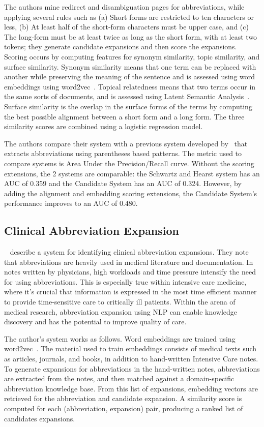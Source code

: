 \documentclass[11pt,a4paper]{article}
\begin{document}
The authors mine redirect and disambiguation pages for abbreviations,
while applying several rules such as (a) Short forms are restricted to
ten characters or less, (b) At least half of the short-form characters
must be upper case, and (c) The long-form must be at least twice as
long as the short form, with at least two tokens; they generate
candidate expansions and then score the expansions.  Scoring occurs by
computing features for synonym similarity, topic similarity, and
surface similarity.  Synonym similarity means that one term can be
replaced with another while preserving the meaning of the sentence and
is assessed using word embeddings using word2vec~\cite{NIPS2013_5021}.
Topical relatedness means that two terms occur in the same sorts of
documents, and is assessed using Latent Semantic
Analysis~\cite{deerwester-indexing-1990}.  Surface similarity is the
overlap in the surface forms of the terms by computing the best
possible alignment between a short form and a long form.   The three
similarity scores are combined using a logistic regression model.

The authors compare their system with a previous system developed
by~\cite{SchwartzH03} that extracts abbreviations using parentheses
based patterns.  The metric used to compare systems is Area Under the
Precision/Recall curve.  Without the scoring extensions, the 2 systems
are comparable: the Schwartz and Hearst system has an AUC of 0.359 and
the Candidate System has an AUC of 0.324.  However, by adding the
alignment and embedding scoring extensions, the Candidate System’s
performance improves to an AUC of 0.480. 

\subsection{Clinical Abbreviation Expansion}
~\cite{liu-etal-2015-exploiting} describe a system for identifying clinical abbreviation
expansions.  They note that abbreviations are heavily used in medical
literature and documentation.  In notes written by physicians, high
workloads and time pressure intensify the need for using
abbreviations.  This is especially true within intensive care
medicine, where it's crucial that information is expressed in the most
time efficient manner to provide time-sensitive care to critically ill
patients.  Within the arena of medical research, abbreviation
expansion using NLP can enable knowledge discovery and has the
potential to improve quality of care.

The author's system works as follows.  Word embeddings are trained
using word2vec~\cite{NIPS2013_5021}.  The material used to train embeddings consists of
medical  texts such as articles, journals, and books, in addition to
hand-written Intensive Care notes.  To generate expansions for
abbreviations in the hand-written notes, abbreviations are extracted
from the notes, and then matched against a domain-specific
abbreviation knowledge base.  From this list of expansions, 
embedding vectors are retrieved for the abbreviation and candidate
expansion.  A similarity score is computed for each (abbreviation,
expansion) pair, producing a ranked list of candidates expansions.
\end{document}

